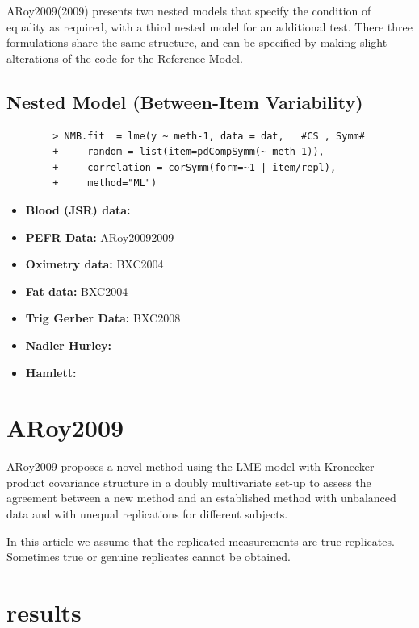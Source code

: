 \documentclass[12pt, a4paper]{report}
\theoremstyle{plain}
\theoremstyle{definition}
\theoremstyle{remark}
\begin{document}
	
	ARoy2009(2009) presents two nested models that specify the condition of equality as required, with a third nested model for an additional test. There three formulations share the same structure, and can be specified by making slight alterations of the code for the Reference Model.
	
	\subsection{Nested Model (Between-Item Variability)}
	\begin{framed}
		\begin{verbatim}
		> NMB.fit  = lme(y ~ meth-1, data = dat,   #CS , Symm#
		+     random = list(item=pdCompSymm(~ meth-1)),
		+     correlation = corSymm(form=~1 | item/repl), 
		+     method="ML")
		\end{verbatim}
	\end{framed}
	
	
	
	
	\begin{itemize}
		\item \textbf{Blood (JSR) data:} 
		\item \textbf{PEFR Data:} ARoy20092009
		\item \textbf{Oximetry data:} BXC2004
		\item \textbf{Fat data:} BXC2004
		\item \textbf{Trig Gerber Data:} BXC2008
		\item \textbf{Nadler Hurley:}
		\item \textbf{Hamlett:}
	\end{itemize}
	\newpage

	\section{ARoy2009}
	ARoy2009 proposes a novel method using the LME model with Kronecker product covariance structure in a doubly multivariate set-up to assess the agreement between a new method and an established
	method with unbalanced data and with unequal replications for different subjects.
	
	In this article we assume that the replicated measurements are true replicates. Sometimes true or genuine replicates cannot be obtained.
	
	\section{results}
	
\end{document}
